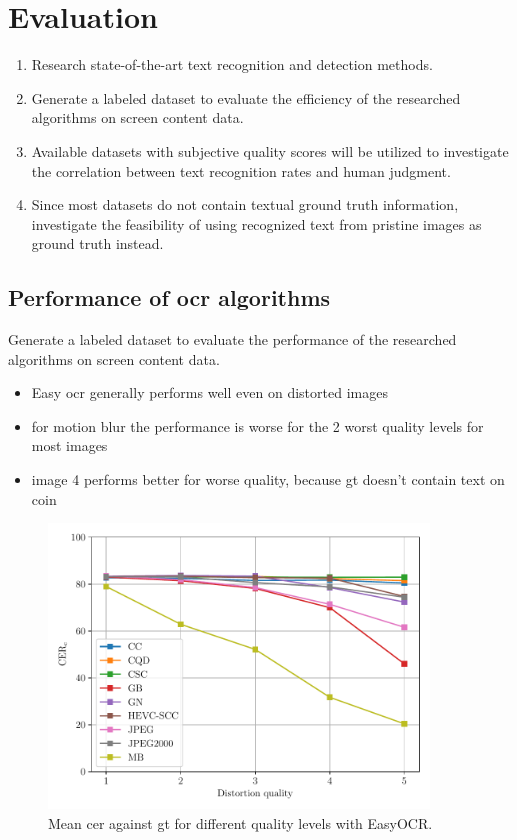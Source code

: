 \chapter{Evaluation}
\label{chap:evaluation}

\begin{enumerate}
\item Research state-of-the-art text recognition and detection methods.

\item Generate a labeled dataset to evaluate the efficiency of the researched algorithms
   on screen content data.

\item Available datasets with subjective quality scores will be utilized to investigate
   the correlation between text recognition rates and human judgment.

\item Since most datasets do not contain textual ground truth information,
   investigate the feasibility of using recognized text from pristine images as ground truth instead.
\end{enumerate}

\section{Performance of ocr algorithms}
\label{sec:ocr_performance}

Generate a labeled dataset to evaluate the performance of the researched algorithms
on screen content data.

\begin{itemize}
\item Easy ocr generally performs well even on distorted images
\item for motion blur the performance is worse for the 2 worst quality levels for most images
\item image 4 performs better for worse quality, because gt doesn't contain text on coin
\end{itemize}

\begin{figure}[h]
\centering
    \includegraphics[width=0.9\textwidth]{../../images/analyze/cer_dist_quality_gt_ezocr.pdf}
    \caption{Mean \gls{cer} against gt for different quality levels with EasyOCR.}
\label{fig:cer_dist_quality_gt_ezocr}
\end{figure}

